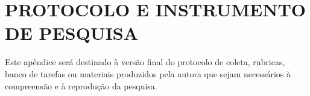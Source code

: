 \chapter{PROTOCOLO E INSTRUMENTO DE PESQUISA}

Este apêndice será destinado à versão final do protocolo de coleta, rubricas, banco de tarefas ou materiais produzidos pela autora que sejam necessários à compreensão e à reprodução da pesquisa.
